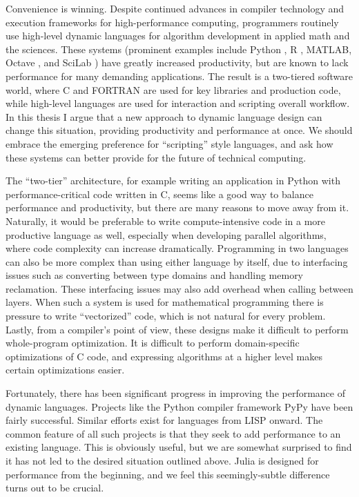\documentclass[11pt]{sigplanconf}
\begin{document}
Convenience is winning. Despite continued advances in compiler technology
and execution frameworks for high-performance computing, programmers
routinely use high-level dynamic languages for algorithm
development in applied math and the sciences. These systems
(prominent examples include Python \cite{numpy}, R \cite{Rlang},
MATLAB\textregistered, Octave \cite{Octave}, and SciLab \cite{scilab})
have greatly increased
productivity, but are known to lack performance for many demanding applications.
The result is a two-tiered software world, where
C and FORTRAN are used for key libraries and production code, while
high-level languages are used for interaction and scripting overall workflow.
In this thesis I argue that a new approach to dynamic language design can
change this situation, providing productivity and performance at once. We
should embrace the emerging preference for ``scripting'' style languages,
and ask how these systems can better provide for the future of technical
computing.

The ``two-tier'' architecture, for example writing an application in
Python with performance-critical code written in C, seems like a good way
to balance performance and productivity, but there are many reasons
to move away from it.
Naturally, it would be preferable to write compute-intensive code in a
more productive language as well, especially when developing parallel
algorithms, where code complexity can increase dramatically.
Programming in two languages can also be more complex
than using either language by itself, due to interfacing issues such as
converting between type domains and handling memory reclamation.
These interfacing
issues may also add overhead when calling between layers. When such a
system is used for mathematical programming there is pressure to write
``vectorized'' code, which is not natural for every problem. Lastly, from
a compiler's point of view, these designs make it difficult to perform
whole-program optimization. It is difficult to perform domain-specific
optimizations of C code, and expressing algorithms at a higher level
makes certain optimizations easier.

Fortunately, there has been significant progress in improving the
performance of dynamic languages. Projects like the Python compiler
framework PyPy \cite{pypyjit} have been fairly successful. Similar efforts
exist for languages from LISP onward. The common feature of all
such projects is that they seek to add performance to an existing
language. This is obviously useful, but we are somewhat surprised to find
it has not led to the desired situation outlined above. Julia is designed
for performance from the beginning, and we feel this
seemingly-subtle difference turns out to be crucial.
\end{document}
